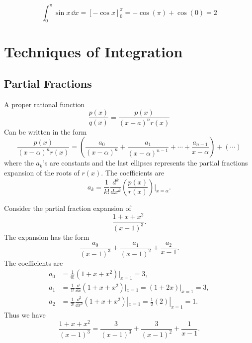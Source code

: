 \begin{Example}
  \[
  \int_0^\pi \sin x \,\dd x = [-\cos x]_0^\pi = - \cos(\pi)+ \cos(0) = 2
  \]
\end{Example}






\section{Techniques of Integration}





\subsection{Partial Fractions}


A proper rational function
\[
\frac{p(x)}{q(x)} = \frac{p(x)}{(x-a)^n r(x)}
\]
Can be written in the form
\[
\frac{p(x)}{(x-\alpha)^n r(x)} = \left( \frac{a_0}{(x-\alpha)^n}
  + \frac{a_1}{(x-\alpha)^{n-1}} + \cdots + \frac{a_{n-1}}{x-\alpha}
\right) + (\cdots)
\]
where the $a_k$'s are constants and the last ellipses represents the
partial fractions expansion of the roots of $r(x)$.  The coefficients are
\[
a_k = \frac{1}{k!} \frac{d^k}{d x^k}
\left( \frac{p(x)}{r(x)} \right) \bigg|_{x=\alpha}.
\]




\begin{Example}
  Consider the partial fraction expansion of
  \[
  \frac{1+x+x^2}{(x-1)^3}.
  \]
  The expansion has the form
  \[
  \frac{a_0}{(x-1)^3} + \frac{a_1}{(x-1)^2} + \frac{a_2}{x-1}.
  \]
  The coefficients are
  \begin{align*}
    a_0     &= \frac{1}{0!} (1+x+x^2)|_{x=1} = 3, \\
    a_1     &= \frac{1}{1!} \frac{\dd}{\dd x}(1+x+x^2)|_{x=1}
    = (1+2x)|_{x=1} = 3, \\
    a_2     &= \frac{1}{2!} \frac{\dd^2}{\dd x^2}(1+x+x^2)|_{x=1}
    = \frac{1}{2} (2)|_{x=1} = 1.
  \end{align*}
  Thus we have
  \[
  \frac{1+x+x^2}{(x-1)^3} = \frac{3}{(x-1)^3} + \frac{3}{(x-1)^2}
  + \frac{1}{x-1}.
  \]
\end{Example}







